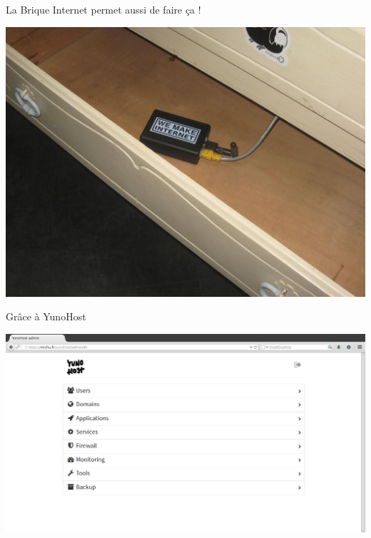 \documentclass[notes=hide]{beamer}
\begin{document}
\begin{frame}[t]{La Brique Internet permet aussi de faire ça !}
\begin{center}
\vfill
\includegraphics[width=.75\textwidth]{img/16-photo-boitiercommode.jpg}
\vfill
\end{center}
\end{frame}

\begin{frame}[t]{Grâce à YunoHost}
\begin{center}
\vfill
\includegraphics[width=\textwidth]{img/17a-capture-yunohost.png}
\vfill
\end{center}
\end{frame}

%
\end{document}
